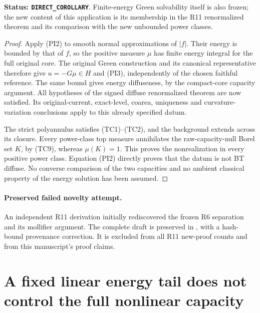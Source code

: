 \documentclass[11pt,a4paper]{article}
\numberwithin{equation}{section}
\theoremstyle{definition}
\theoremstyle{remark}
\begin{document}
\noindent\textbf{Status: \texttt{DIRECT\_COROLLARY}}.
Finite-energy Green solvability itself is also frozen;
the new content of this application is its membership in
the R11 renormalized theorem and its comparison with the
new unbounded power classes.

\begin{proof}
Apply (PI2) to smooth normal approximations of $|f|$.
Their energy is bounded by that of $f$, so the positive
measure $\mu$ has finite energy integral for the full
original core.  The original Green construction and its
canonical representative therefore give $u=-G\mu\in H$
and (PI3), independently of the chosen faithful reference.
The same bound gives energy diffuseness, by the compact-core
capacity argument.  All hypotheses of the signed diffuse
renormalized theorem are now satisfied.
Its original-current, exact-level, coarea, uniqueness and
curvature-variation conclusions apply to this already
specified datum.

The strict polyannulus satisfies (TC1)--(TC2), and the
background extends across its closure.  Every power-class
top measure annihilates the raw-capacity-null Borel set
$K$, by (TC9), whereas $\mu(K)=1$.  This proves the
nonrealization in every positive power class.
Equation (PI2) directly proves that the datum is not
BT diffuse.  No converse comparison of the two capacities
and no ambient classical property of the energy solution
has been assumed.
\end{proof}

\paragraph{Preserved failed novelty attempt.}
An independent R11 derivation initially rediscovered
the frozen R6 separation and its mollifier argument.
The complete draft is preserved in
,
with a hash-bound provenance correction.
It is excluded from all R11 new-proof counts and from
this manuscript's proof claims.



\section{A fixed linear energy tail does not control the full nonlinear capacity}
\label{sec:r11-fixed-tail-energy-obstruction}
\end{document}
